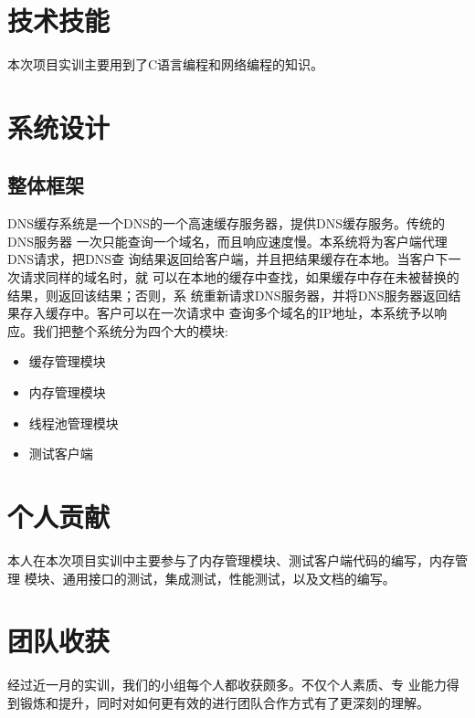 \documentclass[12pt, a4paper, titlepage]{article}
\begin{document}
\section{技术技能}
本次项目实训主要用到了C语言编程和网络编程的知识。

\section{系统设计}
\subsection{整体框架}
\par{DNS缓存系统是一个DNS的一个高速缓存服务器，提供DNS缓存服务。传统的DNS服务器
	一次只能查询一个域名，而且响应速度慢。本系统将为客户端代理DNS请求，把DNS查
	询结果返回给客户端，并且把结果缓存在本地。当客户下一次请求同样的域名时，就
	可以在本地的缓存中查找，如果缓存中存在未被替换的结果，则返回该结果；否则，系
	统重新请求DNS服务器，并将DNS服务器返回结果存入缓存中。客户可以在一次请求中
	查询多个域名的IP地址，本系统予以响应。我们把整个系统分为四个大的模块:	
}
\begin{itemize}
     \item{缓存管理模块}
	\item{内存管理模块}
     \item{线程池管理模块}
     \item{测试客户端}
\end{itemize}

\section{个人贡献}
	本人在本次项目实训中主要参与了内存管理模块、测试客户端代码的编写，内存管理
	模块、通用接口的测试，集成测试，性能测试，以及文档的编写。

\section{团队收获}
经过近一月的实训，我们的小组每个人都收获颇多。不仅个人素质、专
业能力得到锻炼和提升，同时对如何更有效的进行团队合作方式有了更深刻的理解。
\end{document}
